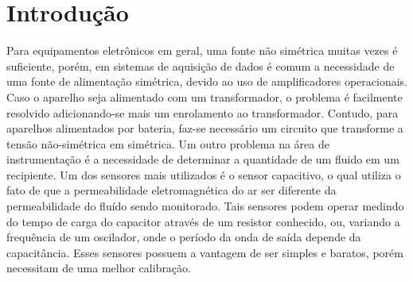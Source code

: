 \newpage
\section{Introdução}
Para equipamentos eletrônicos em geral, uma fonte não simétrica muitas vezes é suficiente, porém, em sistemas de aquisição de dados é comum a necessidade de uma fonte de alimentação simétrica, devido ao uso de amplificadores operacionais. Caso o aparelho seja alimentado com um transformador, o problema é facilmente resolvido adicionando-se mais um enrolamento ao transformador. Contudo, para aparelhos alimentados por bateria, faz-se necessário um circuito que transforme a tensão não-simétrica em simétrica.
Um outro problema na área de instrumentação é a necessidade de determinar a quantidade de um fluido em um recipiente. Um dos sensores mais utilizados é o sensor capacitivo, o qual utiliza o fato de que a permeabilidade eletromagnética do ar ser diferente da permeabilidade do fluído sendo monitorado. Tais sensores podem operar medindo do tempo de carga do capacitor através de um resistor conhecido, ou, variando a frequência de um oscilador, onde o período da onda de saída depende da capacitância. Esses sensores possuem a vantagem de ser simples e baratos, porém necessitam de uma melhor calibração.